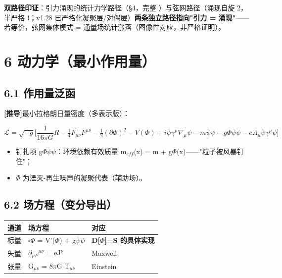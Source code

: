 \documentclass[12pt]{article}
\newcommand{\mtag}[1]{\textbf{[#1]}}
\newcommand{\up}[1]{\ensuremath{^{#1}}}
\newcommand{\down}[1]{\ensuremath{_{#1}}}
\begin{document}
\begin{itemize}
\end{itemize}

\textbf{双路径印证}：引力涌现的统计力学路径（\S{}4，完整 \checkmark）与弦网路径（涌现自旋 2，半严格 \textbf{!}；v1.28 已严格化凝聚层/对偶层）\textbf{两条独立路径指向"引力 = 涌现"}------若等价，弦网集体模式 = 通量场统计涨落（图像性对应，非严格证明）。



\section{6 动力学（最小作用量）}

\subsection{6.1 作用量泛函}

\mtag{推导}最小拉格朗日量密度（多表示版）：

\[\mathcal{L} = \sqrt{-g}\Big[\frac{1}{16\pi G}R - \tfrac14 F_{\mu\nu}F^{\mu\nu} - \tfrac12(\partial\Phi)^2 - V(\Phi) + i\bar\psi\gamma^\mu\nabla_\mu\psi - m\bar\psi\psi - g\Phi\bar\psi\psi - eA_\mu\bar\psi\gamma^\mu\psi\Big]\]

\begin{itemize}
\item 钉扎项 g\ensuremath{\Phi}\ensuremath{\bar{\psi}}\ensuremath{\psi}：环境依赖有效质量 m\down{eff}(x) = m + g\ensuremath{\Phi}(x)------"粒子被风暴钉住"；
\item \ensuremath{\Phi} 为湮灭-再生噪声的凝聚代表（辅助场）。
\end{itemize}

\subsection{6.2 场方程（变分导出）}

\begin{table}[htbp]
\centering
\small
\begin{tabularx}{\textwidth}{@{}lXX@{}}
\toprule
通道 & 场方程 & 对应 \\
\midrule
标量 & \ensuremath{\square}\ensuremath{\Phi} = V'(\ensuremath{\Phi}) + g\ensuremath{\bar{\psi}}\ensuremath{\psi} & \textbf{D[\ensuremath{\Phi}]=S 的具体实现} \\
矢量 & \ensuremath{\partial}\down{\mu{}F}\up{\mu{}\nu{}} = eJ\up{\nu{}} & Maxwell \\
张量 & G\down{\mu{}\nu{}} = 8\ensuremath{\pi}G T\down{\mu{}\nu{}} & Einstein \\
\bottomrule
\end{tabularx}
\end{table}
\end{document}
